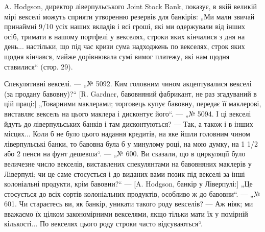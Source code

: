 A. Hodgson, директор ліверпульського Joint Stock Bank, показує, в якій великій мірі векселі можуть
сприяти утворенню резервів для банкірів: „Ми мали
звичай принаймні 9/10 усіх наших вкладів і всі гроші, які ми одержували від
інших осіб, тримати в нашому портфелі у векселях, строки яких кінчалися
з дня на день... настільки, що під час кризи сума надходжень по векселях,
строк яких щодня кінчався, майже дорівнювала сумі вимог платежу, які нам
щодня ставилися“ (стор. 29).

Спекулятивні векселі. — „№ 5092. Ким головним чином акцептувалися векселі (за продану бавовну)?“ [R.
Gardner, бавовняний фабрикант, не раз згадуваний в цій праці:] „Товарними маклерами; торговець купує
бавовну,
передає її маклерові, виставляє вексель на цього маклера і дисконтує його“. — „№ 5094. І ці векселі
йдуть до ліверпульських банків і там дисконтуються? — Так, а також і в інших місцях... Коли б не
було цього надання кредитів, на яке
йшли головним чином ліверпульські банки, то бавовна була б у минулому році,
на мою думку, на 1 1/2 або 2 пенси на фунт дешевша“. — „№ 600. Ви сказали,
що в циркуляції було величезне число векселів, виставлених спекулянтами на
бавовняних маклерів у Ліверпулі; чи це саме стосується і до виданих вами
позик під векселі за інші колоніальні продукти, крім бавовни?“ — [A. Hodgson,
банкір у Ліверпулі:] „Це стосується до всіх сортів колоніальних продуктів,
особливо ж до бавовни“. — „№ 601. Чи стараєтесь ви, як банкір, уникати
такого роду векселів? — Аж ніяк; ми вважаємо їх цілком закономірними векселями, якщо тільки мати їх
у помірній кількості... По векселях цього роду
строки часто відсуваються“.

